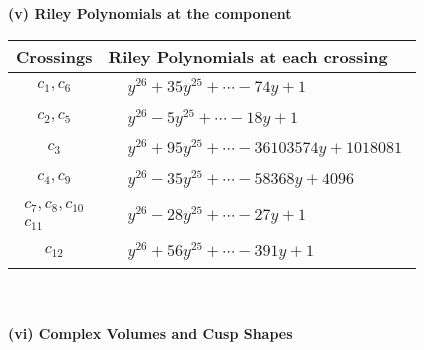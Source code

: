 \documentclass[1p]{elsarticle_modified}
\theoremstyle{definition}
\begin{document}
\newpage\renewcommand{\arraystretch}{1}
\flushleft \textbf{(v) Riley Polynomials at the component}\newline \\
\begin{tabular}{m{50pt}|m{274pt}}
Crossings & \hspace{64pt}Riley Polynomials at each crossing \\
\hline $$\begin{aligned}c_{1},c_{6}\end{aligned}$$&$\begin{aligned}
&y^{26}+35 y^{25}+\cdots-74 y+1
\end{aligned}$\\
\hline $$\begin{aligned}c_{2},c_{5}\end{aligned}$$&$\begin{aligned}
&y^{26}-5 y^{25}+\cdots-18 y+1
\end{aligned}$\\
\hline $$\begin{aligned}c_{3}\end{aligned}$$&$\begin{aligned}
&y^{26}+95 y^{25}+\cdots-36103574 y+1018081
\end{aligned}$\\
\hline $$\begin{aligned}c_{4},c_{9}\end{aligned}$$&$\begin{aligned}
&y^{26}-35 y^{25}+\cdots-58368 y+4096
\end{aligned}$\\
\hline $$\begin{aligned}c_{7},c_{8},c_{10}\\c_{11}\end{aligned}$$&$\begin{aligned}
&y^{26}-28 y^{25}+\cdots-27 y+1
\end{aligned}$\\
\hline $$\begin{aligned}c_{12}\end{aligned}$$&$\begin{aligned}
&y^{26}+56 y^{25}+\cdots-391 y+1
\end{aligned}$\\
\hline
\end{tabular}\\~\\
\newpage\flushleft \textbf{(vi) Complex Volumes and Cusp Shapes}
\end{document}
